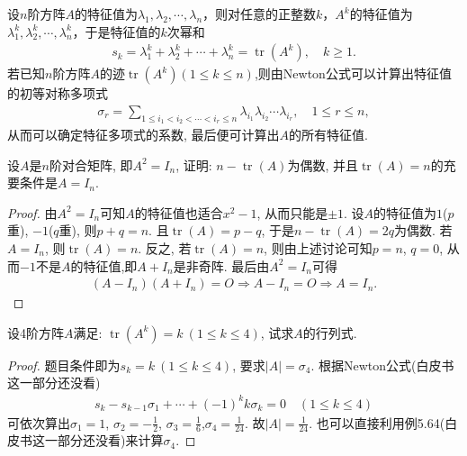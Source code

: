 \documentclass[../../main.tex]{subfiles}%
\begin{document}
\begin{conclusion}
设$n$阶方阵$A$的特征值为$\lambda_1, \lambda_2, \cdots, \lambda_n$，则对任意的正整数$k$，$A^k$的特征值为$\lambda_1^k, \lambda_2^k, \cdots, \lambda_n^k$，于是特征值的$k$次幂和
\begin{align*}
s_k = \lambda_1^k + \lambda_2^k + \cdots + \lambda_n^k = \operatorname{tr}(A^k), \quad k \geqslant  1.
\end{align*}
若已知$n$阶方阵$A$的迹$\operatorname{tr}(A^k)(1\leqslant  k \leqslant  n)$,则由Newton公式可以计算出特征值的初等对称多项式
\begin{align*}
\sigma_r = \sum_{1 \leqslant  i_1 < i_2 < \cdots < i_r \leqslant  n} \lambda_{i_1} \lambda_{i_2} \cdots \lambda_{i_r}, \quad 1 \leqslant  r \leqslant  n,
\end{align*}
从而可以确定特征多项式的系数, 最后便可计算出$A$的所有特征值.
\end{conclusion}

\begin{example}
设$A$是$n$阶对合矩阵, 即$A^2 = I_n$, 证明: $n - \operatorname{tr}(A)$为偶数, 并且$\operatorname{tr}(A) = n$的充要条件是$A = I_n$.
\end{example}
\begin{proof}
由$A^2 = I_n$可知$A$的特征值也适合$x^2 - 1$, 从而只能是$\pm 1$. 设$A$的特征值为$1$($p$重), $-1$($q$重), 则$p + q = n$. 且$\operatorname{tr}(A) = p - q$, 于是$n - \operatorname{tr}(A) = 2q$为偶数. 若$A = I_n$, 则$\operatorname{tr}(A) = n$. 反之, 若$\operatorname{tr}(A) = n$, 则由上述讨论可知$p = n$, $q = 0$, 从而$-1$不是$A$的特征值,即$A + I_n$是非奇阵. 最后由$A^2=I_n$可得
\begin{align*}
(A - I_n)(A + I_n) = O\Rightarrow A-I_n=O\Rightarrow A = I_n.
\end{align*}
\end{proof}

\begin{example}
设4阶方阵$A$满足: $\operatorname{tr}(A^k) = k \ (1 \leqslant  k \leqslant  4)$, 试求$A$的行列式.
\end{example}
\begin{proof}
题目条件即为$s_k = k \ (1 \leqslant  k \leqslant  4)$, 要求$\lvert A \rvert = \sigma_4$. 根据Newton公式(白皮书这一部分还没看)
\begin{align*}
s_k - s_{k-1} \sigma_1 + \cdots + (-1)^k k \sigma_k = 0 \quad (1 \leqslant  k \leqslant  4)
\end{align*}
可依次算出$\sigma_1 = 1$, $\sigma_2 = -\frac{1}{2}$, $\sigma_3 = \frac{1}{6}$,$\sigma_4 = \frac{1}{24}.$
故$\lvert A \rvert = \frac{1}{24}$. 也可以直接利用例5.64(白皮书这一部分还没看)来计算$\sigma_4$.
\end{proof}
\end{document}
